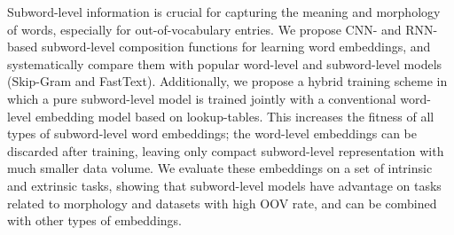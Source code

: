 Subword-level information is crucial for capturing the meaning and morphology of words, especially for out-of-vocabulary entries. We propose CNN- and RNN-based subword-level composition functions for learning word embeddings, and systematically compare them with popular word-level and subword-level models (Skip-Gram and FastText). Additionally, we propose a hybrid training scheme in which a pure subword-level model is trained jointly with a conventional word-level embedding model based on lookup-tables. This increases the fitness of all types of subword-level word embeddings; the word-level embeddings can be discarded after training, leaving only compact subword-level representation with much smaller data volume. We evaluate these embeddings on a set of intrinsic and extrinsic tasks, showing that subword-level models have advantage on tasks related to morphology and datasets with high OOV rate, and can be combined with other types of embeddings.
